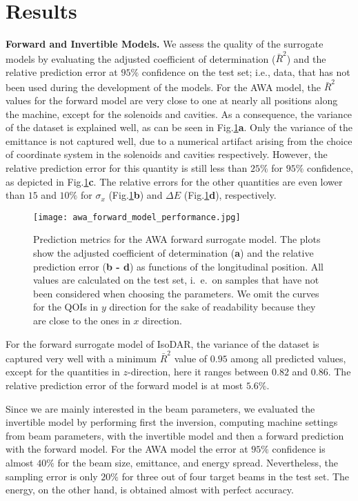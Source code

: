 \documentclass[a4paper, 12pt, version-1-compatibility]{article}
\newcommand{\figref}[1]{Fig.\xspace\ref{#1}}
\begin{document}
\section*{Results}
{\bf Forward and Invertible Models.}
We assess the quality of the surrogate models by evaluating the adjusted coefficient of determination ($\bar{R}^2$) and the relative prediction error at $95\%$ confidence on the test set; i.e., data, that has not been used during the development of the models.
For the AWA model, the $\bar{R}^2$ values for the forward model are very close to one at nearly all positions along the machine, except for the solenoids and cavities. As a consequence, the variance of the dataset is explained well, as can be seen in \figref{fig:awa_forward_performance}{\bf{a}}. Only the variance of the emittance is not captured well, due to a numerical artifact arising from the 
choice of coordinate system in the solenoids and cavities respectively. However, the relative prediction error for this quantity is still less than $25\%$ for $95\%$ confidence, as depicted in \figref{fig:awa_forward_performance}{\bf{c}}. The relative errors for the other quantities are even lower than $15$ and $10\%$ for $\sigma_x$ (\figref{fig:awa_forward_performance}{\bf{b}}) and  $\Delta E$ (\figref{fig:awa_forward_performance}{\bf{d}}), respectively.

\begin{figure}
    \centering
    \texttt{[image: awa\_forward\_model\_performance.jpg]}
    \caption{Prediction metrics for the AWA forward surrogate model. The plots show the adjusted coefficient of determination (\textbf{a}) and the relative prediction error (\textbf{b - d}) as functions of the longitudinal position. All values are calculated on the test set, i.\ e.\, on samples that have not been considered when choosing the parameters. We omit the curves for the QOIs in $y$ direction for the sake of readability because they are close to the ones in $x$ direction.}
    \label{fig:awa_forward_performance}
\end{figure}

For the forward surrogate model of IsoDAR, the variance of the dataset is captured very well with a minimum $\bar{R}^2$ value of $0.95$ among all predicted values, except for the quantities in $z$-direction, here it ranges between $0.82$ and $0.86$. The relative prediction error of the forward model is at most $5.6\%$.

Since we are mainly interested in the beam parameters, we evaluated the invertible model by performing first the inversion, computing machine settings from beam parameters, with the invertible model and then a forward prediction with the forward model. For the AWA model the error at $95\%$ confidence is almost $40\%$ for the beam size, emittance, and energy spread. Nevertheless, the sampling error is only $20\%$ for three out of four target beams in the test set. The energy, on the other hand, is obtained almost with perfect accuracy.
\end{document}
